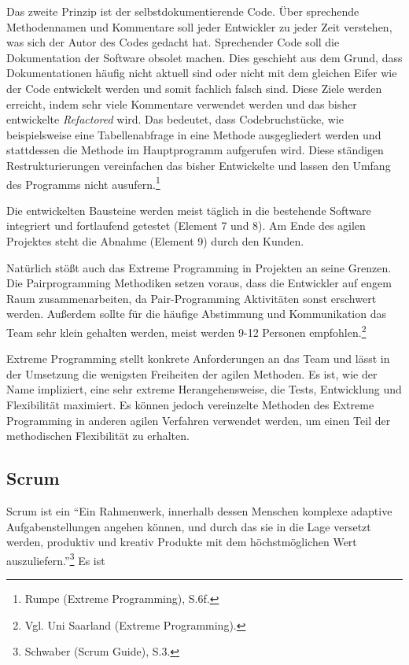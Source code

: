             Das zweite Prinzip ist der selbstdokumentierende Code. Über sprechende Methodennamen und Kommentare soll jeder Entwickler zu jeder Zeit verstehen, was sich der Autor des Codes gedacht hat. Sprechender Code soll die Dokumentation der Software obsolet machen. Dies geschieht aus dem Grund, dass Dokumentationen häufig nicht aktuell sind oder nicht mit dem gleichen Eifer wie der Code entwickelt werden und somit fachlich falsch sind. Diese Ziele werden erreicht, indem sehr viele Kommentare verwendet werden und das bisher entwickelte \emph{Refactored} wird. Das bedeutet, dass Codebruchstücke, wie beispielsweise eine Tabellenabfrage in eine Methode ausgegliedert werden und stattdessen die Methode im Hauptprogramm aufgerufen wird. Diese ständigen Restrukturierungen vereinfachen das bisher Entwickelte und lassen den Umfang des Programms nicht ausufern.\footnote{Rumpe (Extreme Programming), S.6f.}

            Die entwickelten Bausteine werden meist täglich in die bestehende Software integriert und fortlaufend getestet (Element 7 und 8). Am Ende des agilen Projektes steht die Abnahme (Element 9) durch den Kunden.

            Natürlich stößt auch das Extreme Programming in Projekten an seine Grenzen. Die Pairprogramming Methodiken setzen voraus, dass die Entwickler auf engem Raum zusammenarbeiten, da Pair-Programming Aktivitäten sonst erschwert werden. Außerdem sollte für die häufige Abstimmung und Kommunikation das Team sehr klein gehalten werden, meist werden 9-12 Personen empfohlen.\footnote{Vgl. Uni Saarland (Extreme Programming).}

            Extreme Programming stellt konkrete Anforderungen an das Team und lässt in der Umsetzung die wenigsten Freiheiten der agilen Methoden. Es ist, wie der Name impliziert, eine sehr extreme Herangehensweise, die Tests, Entwicklung und Flexibilität maximiert. Es können jedoch vereinzelte Methoden des Extreme Programming in anderen agilen Verfahren verwendet werden, um einen Teil der methodischen Flexibilität zu erhalten.

        \subsection{Scrum}
        \label{subsec:scrum}

            Scrum ist ein \enquote{Ein Rahmenwerk, innerhalb dessen Menschen komplexe adaptive Aufgabenstellungen angehen können, und durch das sie in die Lage versetzt werden, produktiv und kreativ Produkte mit dem höchstmöglichen Wert auszuliefern.}\footnote{Schwaber (Scrum Guide), S.3.} Es ist


